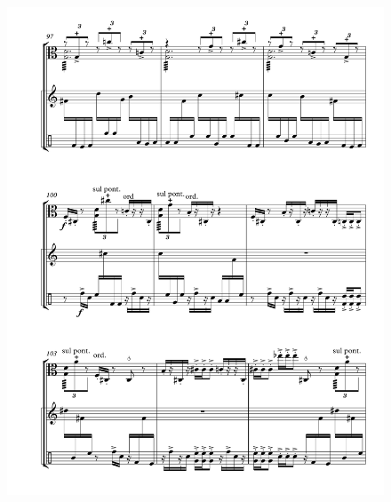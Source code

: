 \begin{figure}[htbp]
    \centering
	\includegraphics[width=6.5in]{figures/Viola_Percussion_14.pdf}
\end{figure}

